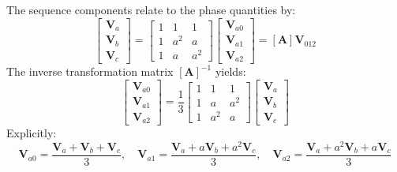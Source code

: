 \documentclass[12pt,a4paper]{article}
\begin{document}
\begin{tcolorbox}[formulabox, title={\textbf{Matrix Transformation Relations}}]
The sequence components relate to the phase quantities by:
\begin{equation}
  \begin{bmatrix} \mathbf{V}_a \\ \mathbf{V}_b \\ \mathbf{V}_c \end{bmatrix}
  =
  \begin{bmatrix}
    1 & 1 & 1 \\
    1 & a^2 & a \\
    1 & a & a^2
  \end{bmatrix}
  \begin{bmatrix} \mathbf{V}_{a0} \\ \mathbf{V}_{a1} \\ \mathbf{V}_{a2} \end{bmatrix}
  = [\mathbf{A}] \mathbf{V}_{012}
\end{equation}
The inverse transformation matrix $[\mathbf{A}]^{-1}$ yields:
\begin{equation}
  \begin{bmatrix} \mathbf{V}_{a0} \\ \mathbf{V}_{a1} \\ \mathbf{V}_{a2} \end{bmatrix}
  = \frac{1}{3}
  \begin{bmatrix}
    1 & 1 & 1 \\
    1 & a & a^2 \\
    1 & a^2 & a
  \end{bmatrix}
  \begin{bmatrix} \mathbf{V}_a \\ \mathbf{V}_b \\ \mathbf{V}_c \end{bmatrix}
\end{equation}
Explicitly:
\begin{equation}
  \mathbf{V}_{a0} = \frac{\mathbf{V}_a + \mathbf{V}_b + \mathbf{V}_c}{3}, \quad \mathbf{V}_{a1} = \frac{\mathbf{V}_a + a\mathbf{V}_b + a^2\mathbf{V}_c}{3}, \quad \mathbf{V}_{a2} = \frac{\mathbf{V}_a + a^2\mathbf{V}_b + a\mathbf{V}_c}{3}
\end{equation}
\end{tcolorbox}
\end{document}
